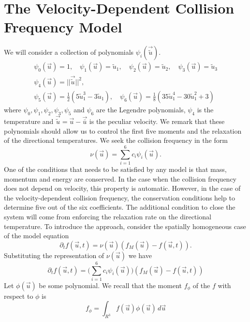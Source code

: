 \section{The Velocity-Dependent Collision Frequency Model}
We will consider a collection of polynomials $\psi_{i}(\vec{\tilde{u}})$.
%
\begin{gather*}
\psi_{0}(\vec{u}) =1,\quad \psi_{1}(\vec{u})=\tilde{u}_1,\quad \psi_{2}(\vec{u})=\tilde{u}_2,\quad \psi_{3}(\vec{u})=\tilde{u}_3 \\
\psi_{4}(\vec{u}) = ||\vec{\tilde{u}}||^2,\quad \\
\psi_{5}(\vec{u}) = \frac{1}{2}(5 \tilde{u}_1^3 - 3 \tilde{u}_1),\quad
\psi_{6}(\vec{u}) = \frac{1}{8}(35 \tilde{u}_1^4 - 30 \tilde{u}_1^2 + 3)
\end{gather*}
%
where $\psi_0,\psi_1,\psi_2,\psi_3,\psi_5$ and $\psi_6$ are the Legendre polynomials, $\psi_4$ is the temperature and $\vec{\tilde{u}} = \vec{u}-\vec{\bar{u}}$ is the peculiar velocity. We remark that these polynomials should allow us to control the first five moments and the relaxation of the directional temperatures. We seek the collision frequency in the form
%
\begin{equation*}
\nu(\vec{u}) = \sum_{i=1}^6 c_{i}\psi_{i}(\vec{u}).
\end{equation*}
%
One of the conditions that needs to be satisfied by any model is that mass, momentum and energy are conserved. In the case when the collision frequency does not depend on velocity, this property is automatic. However, in the case of the velocity-dependent collision frequency, the conservation conditions help to determine five out of the six coefficients. The additional condition to close the system will come from enforcing the relaxation rate on the directional temperature. To introduce the approach, consider the  spatially homogeneous case of the model equation
%
\begin{equation*}
\partial_{t} f(\vec{u},t)= \nu(\vec{u})(f_M(\vec{u})-f(\vec{u},t)).
\end{equation*}
%
Substituting the representation of $\nu(\vec{u})$ we have
%
\begin{equation*}
\partial_{t} f(\vec{u},t) = \Big( \sum_{i=1}^6 c_{i}\psi_{i}(\vec{u})\Big) (f_M(\vec{u})-f(\vec{u},t))
\end{equation*}
%
Let $\phi(\vec{u})$ be some polynomial. We recall that the moment $f_{\phi}$ of the $f$ with respect to $\phi$ is 
%
\begin{equation*}
f_{\phi}=\int_{R^3} f(\vec{u})\phi(\vec{u})\, d\vec{u}
\end{equation*}
